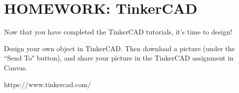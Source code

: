 
\section{HOMEWORK: TinkerCAD}

Now that you have completed the TinkerCAD tutorials, it's time to design!

\begin{exercise}
Design your own object in TinkerCAD. Then download a picture (under the ``Send To" button), and share your picture in the TinkerCAD assignment in Canvas.
\end{exercise}
{\footnotesize https://www.tinkercad.com/}


